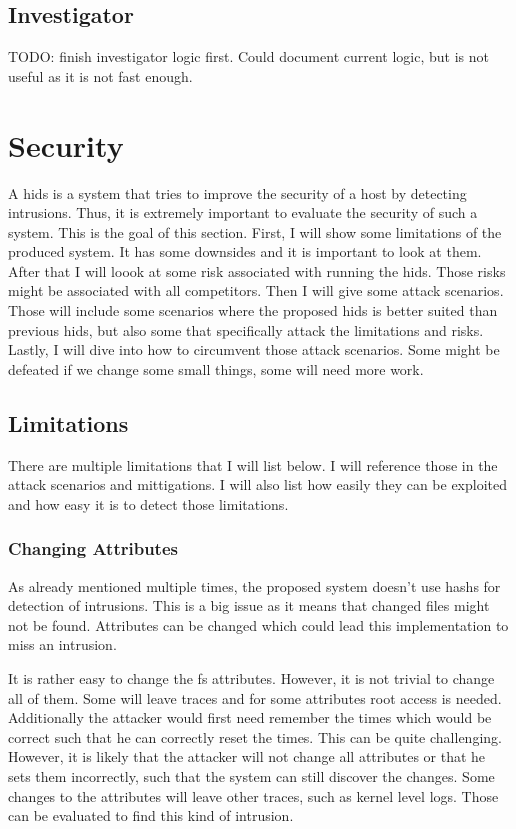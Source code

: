 \documentclass[
	a4paper,					%
	10pt,							%
	twoside,					%
	openright,				%
	notitlepage,			%
	parskip=half,			%
]{scrreprt}					%
\begin{document}
\subsection{Investigator}
\label{sec:Investigator}

TODO: finish investigator logic first. Could document current logic, but is not useful as it is not fast enough. 

\section{Security}
\label{sec:Security}

A \gls{hids} is a system that tries to improve the security of a host by detecting intrusions. Thus, it is extremely important to evaluate the security of such a system. This is the goal of this section. First, I will show some limitations of the produced system. It has some downsides and it is important to look at them. After that I will loook at some risk associated with running the \gls{hids}. Those risks might be associated with all competitors. Then I will give some attack scenarios. Those will include some scenarios where the proposed \gls{hids} is better suited than previous \gls{hids}, but also some that specifically attack the limitations and risks. Lastly, I will dive into how to circumvent those attack scenarios. Some might be defeated if we change some small things, some will need more work.

\subsection{Limitations}
\label{sec:Limitations}

There are multiple limitations that I will list below. I will reference those in the attack scenarios and mittigations. I will also list how easily they can be exploited and how easy it is to detect those limitations.

\subsubsection{Changing Attributes}
\label{sec:limitation:chattr}
As already mentioned multiple times, the proposed system doesn't use \glspl{hash} for detection of intrusions. This is a big issue as it means that changed files might not be found. Attributes can be changed which could lead this implementation to miss an intrusion.  \cite{chaning:times, changing:attributes}

It is rather easy to change the \gls{fs} attributes. However, it is not trivial to change all of them. Some will leave traces and for some attributes root access is needed. Additionally the attacker would first need remember the times which would be correct such that he can correctly reset the times. This can be quite challenging. However, it is likely that the attacker will not change all attributes or that he sets them incorrectly, such that the system can still discover the changes. Some changes to the attributes will leave other traces, such as kernel level logs. Those can be evaluated to find this kind of intrusion.
\end{document}
